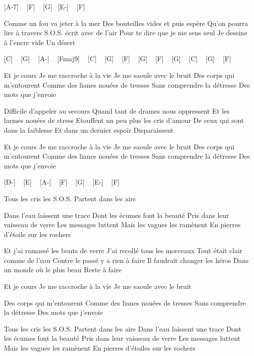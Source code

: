


 [A-7]   ~ [F] ~ [G] ~[E-] ~ [F]


Comme un fou va jeter à la mer
Des bouteilles vides et puis espère
Qu'on pourra lire à travers
S.O.S. écrit avec de l'air
Pour te dire que je me sens seul
Je dessine à l'encre vide
Un désert


 [C] ~  [G] ~  [A-] ~   [Fmaj9] ~ [C] ~ 
[G] ~ [F] ~ [G] ~ [F] ~ [G] ~ [C] ~ [G] ~ [F]

Et je cours
Je me raccroche à la vie
Je me saoule avec le bruit
Des corps qui m'entourent
Comme des lianes nouées de tresses
Sans comprendre la détresse
Des mots que j'envoie


Difficile d'appeler au secours
Quand tant de drames nous oppressent
Et les larmes nouées de stress
Etouffent un peu plus les cris d'amour
De ceux qui sont dans la faiblesse
Et dans un dernier espoir
Disparaissent

Et je cours
Je me raccroche à la vie
Je me saoule avec le bruit
Des corps qui m'entourent
Comme des lianes nouées de tresses
Sans comprendre la détresse
Des mots que j'envoie

[D-] ~ [E] ~ [A-] ~ [F] ~ [G] ~ [E-] ~ [F] ~

Tous les cris les S.O.S.
Partent dans les airs

Dans l'eau laissent une trace
Dont les écumes font la beauté
Pris dans leur vaisseau de verre
Les messages luttent
Mais les vagues les ramènent
En pierres d'étoile sur les rochers

Et j'ai ramassé les bouts de verre
J'ai recollé tous les morceaux
Tout était clair comme de l'eau
Contre le passé y a rien à faire
Il faudrait changer les héros
Dans un monde où le plus beau
Reste à faire

Et je cours
Je me raccroche à la vie
Je me saoule avec le bruit

Des corps qui m'entourent
Comme des lianes nouées de tresses
Sans comprendre la détresse
Des mots que j'envoie

Tous les cris les S.O.S.
Partent dans les airs
Dans l'eau laissent une trace
Dont les écumes font la beauté
Pris dans leur vaisseau de verre
Les messages luttent
Mais les vagues les ramènent
En pierres d'étoiles sur les rochers 
